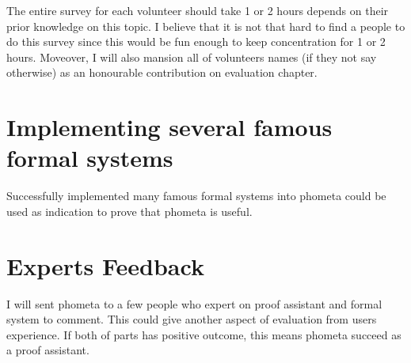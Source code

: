\documentclass[master.tex]{subfiles}
\begin{document}
The entire survey for each volunteer should take 1 or 2 hours depends on their prior knowledge on this topic. I believe that it is not that hard to find a people to do this survey since this would be fun enough to keep concentration for 1 or 2 hours. Moveover, I will also mansion all of volunteers names (if they not say otherwise) as an honourable contribution on evaluation chapter.

\section{Implementing several famous formal systems}
Successfully implemented many famous formal systems into phometa could be used
as indication to prove that phometa is useful.

\section{Experts Feedback}

I will sent phometa to a few people who expert on proof assistant and formal system to comment. This could give another aspect of evaluation from users experience. If both of parts has positive outcome, this means phometa succeed as a proof assistant.
\end{document}
